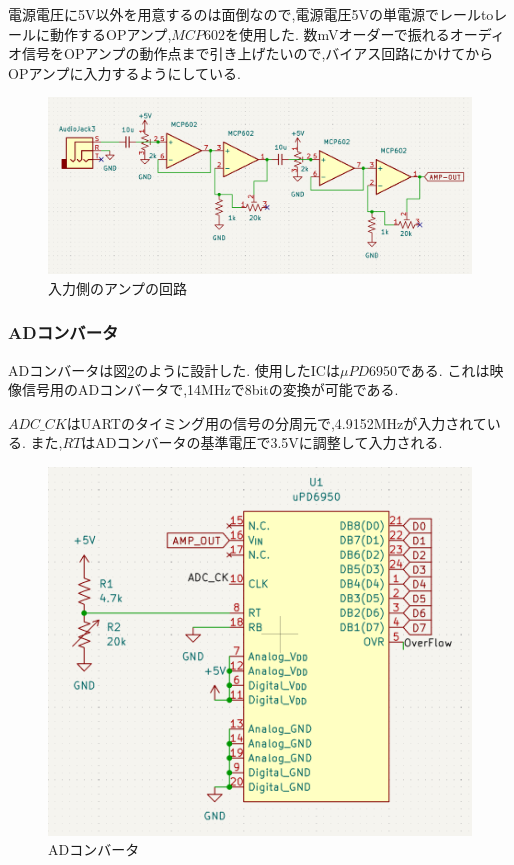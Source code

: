 \documentclass[a4paper,10pt]{article}
\begin{document}
\begin{multicols}{2}
電源電圧に5V以外を用意するのは面倒なので,電源電圧5Vの単電源でレールtoレールに動作するOPアンプ,$MCP602$を使用した.
数mVオーダーで振れるオーディオ信号をOPアンプの動作点まで引き上げたいので,バイアス回路にかけてからOPアンプに入力するようにしている.

\begin{figure}[H]
    \centering
    \includegraphics[width=1.5\linewidth,angle=270]{figure/in_amp.png} 
    \caption{入力側のアンプの回路} 
    \label{fig:in_amp}
\end{figure}

\subsubsection{ADコンバータ}
ADコンバータは図\ref{fig:adc}のように設計した.
使用したICは$\mu PD6950$である.
これは映像信号用のADコンバータで,14MHzで8bitの変換が可能である.

$ADC\_CK$はUARTのタイミング用の信号の分周元で,4.9152MHzが入力されている.
また,$RT$はADコンバータの基準電圧で3.5Vに調整して入力される.

\begin{figure}[H]
    \centering
    \includegraphics[width=0.8\linewidth]{figure/adc.png} 
    \caption{ADコンバータ} 
    \label{fig:adc}
\end{figure}


\end{multicols}
\end{document}

